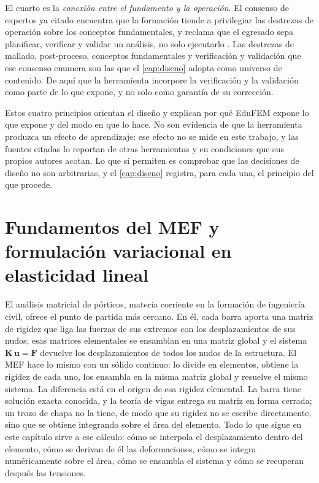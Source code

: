 El cuarto es la \emph{conexión entre el fundamento y la operación}. El consenso de expertos ya citado encuentra que la formación tiende a privilegiar las destrezas de operación sobre los conceptos fundamentales, y reclama que el egresado sepa planificar, verificar y validar un análisis, no solo ejecutarlo \autocite[pp.~1159, 1168]{perezsantiago2023fem}. Las destrezas de mallado, post-proceso, conceptos fundamentales y verificación y validación que ese consenso enumera \autocite[p.~1163]{perezsantiago2023fem} son las que el \autoref{cap:diseno} adopta como universo de contenido. De aquí que la herramienta incorpore la verificación y la validación como parte de lo que expone, y no solo como garantía de su corrección.

Estos cuatro principios orientan el diseño y explican por qué EduFEM expone lo que expone y del modo en que lo hace. No son evidencia de que la herramienta produzca un efecto de aprendizaje: ese efecto no se mide en este trabajo, y las fuentes citadas lo reportan de otras herramientas y en condiciones que sus propios autores acotan. Lo que sí permiten es comprobar que las decisiones de diseño no son arbitrarias, y el \autoref{cap:diseno} registra, para cada una, el principio del que procede.

\section{Fundamentos del MEF y formulación variacional en elasticidad lineal}
\label{sec:formulacion-debil}

El análisis matricial de pórticos, materia corriente en la formación de ingeniería civil, ofrece el punto de partida más cercano. En él, cada barra aporta una matriz de rigidez que liga las fuerzas de sus extremos con los desplazamientos de sus nudos; esas matrices elementales se ensamblan en una matriz global y el sistema $\bm{K}\,\bm{u} = \bm{F}$ devuelve los desplazamientos de todos los nudos de la estructura. El MEF hace lo mismo con un sólido continuo: lo divide en elementos, obtiene la rigidez de cada uno, los ensambla en la misma matriz global y resuelve el mismo sistema. La diferencia está en el origen de esa rigidez elemental. La barra tiene solución exacta conocida, y la teoría de vigas entrega su matriz en forma cerrada; un trozo de chapa no la tiene, de modo que su rigidez no se escribe directamente, sino que se obtiene integrando sobre el área del elemento. Todo lo que sigue en este capítulo sirve a ese cálculo: cómo se interpola el desplazamiento dentro del elemento, cómo se derivan de él las deformaciones, cómo se integra numéricamente sobre el área, cómo se ensambla el sistema y cómo se recuperan después las tensiones.

